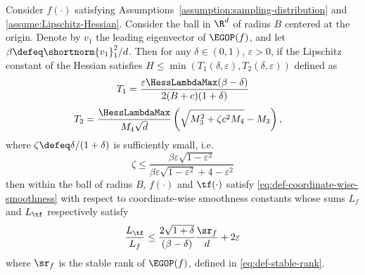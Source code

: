 \begin{theorem}\label{thm:simplified-smoothness-ratio}
    Consider $f(\cdot)$ satisfying Assumptions~\ref{assumption:sampling-distribution} and  \ref{assume:Lipschitz-Hessian}. Consider the ball in $\R^d$ of radius $B$ centered at the origin. Denote by $v_1$ the leading eigenvector of $\EGOP(f)$, and let $\beta \defeq \shortnorm{v_1}^2_1/d$. Then for any $\delta \in (0, 1)$, $\varepsilon > 0$, if the Lipschitz constant of the Hessian satisfies $H\leq \min(T_1(\delta, \varepsilon), T_2(\delta, \varepsilon))$ defined as
    \[
        T_1 = \frac{\varepsilon\HessLambdaMax (\beta-\delta)}{2(B+c)(1+\delta)}
    \]
    \begin{align*}
        T_2 &= \frac{\HessLambdaMax}{M_4 \sqrt{d}}\left(\sqrt{M_3^2 + \zeta c^2 M_4} -  M_3\right),
    \end{align*}
    where $\zeta \defeq \delta/(1+\delta)$ is sufficiently small, i.e.
    \[
        \zeta \leq \frac{\beta \varepsilon\sqrt{1-\varepsilon^2}}{\beta \varepsilon\sqrt{1-\varepsilon^2} + 4-\varepsilon^2}
    \]
    then within the ball of radius $B$, $f(\cdot)$ and $\tf(\cdot)$ satisfy \cref{eq:def-coordinate-wise-smoothness} with respect to coordinate-wise smoothness constants whose sums $L_f$ and $L_{\tf}$ respectively satisfy
    \[
        \frac{L_{\tf}}{L_f}\leq \frac{2\sqrt{1+\delta}}{(\beta-\delta)}\frac{\sr_f}{d} +2\varepsilon
    \]
    where $\sr_f$ is the stable rank of $\EGOP(f)$, defined in \cref{eq:def-stable-rank}.
\end{theorem}

